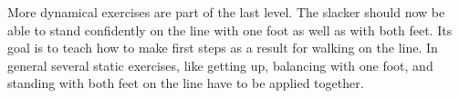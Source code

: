 More dynamical exercises are part of the last level.
The slacker should now be able to stand confidently on the line with one foot as well as with both feet.
Its goal is to teach how to make first steps as a result for walking on the line.
In general several static exercises, like getting up, balancing with one foot, and standing with both feet on the line have to be applied together.

